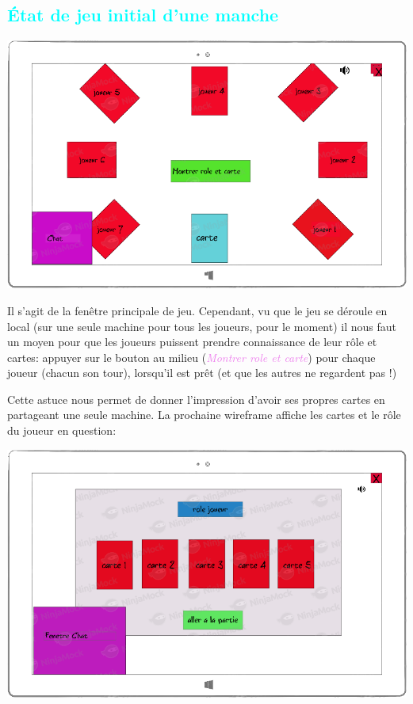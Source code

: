 \documentclass[a4paper]{article}
\let\oldsubsection\subsection
\renewcommand{\subsection}[1]{\textcolor{cyan}{\oldsubsection{#1}}}
\let\oldtextit\textit
\renewcommand{\textit}[1]{\textcolor{violet}{\oldtextit{#1}}}
\begin{document}
\subsection{État de jeu initial d'une manche}

\begin{center}
    \includegraphics[scale=2]{img/partie_avant_devoiler.png}
\end{center}

Il s'agit de la fenêtre principale de jeu. Cependant, vu que le jeu se déroule en local (sur une seule machine pour tous les joueurs, pour le moment) il nous faut un moyen pour que les joueurs puissent prendre connaissance de leur rôle et cartes: appuyer sur le bouton au milieu (\textit{Montrer role et carte}) pour chaque joueur (chacun son tour), lorsqu'il est prêt (et que les autres ne regardent pas !)

Cette astuce nous permet de donner l'impression d'avoir ses propres cartes en partageant une seule machine. La prochaine wireframe affiche les cartes et le rôle du joueur en question:

\begin{center}
    \includegraphics[scale=2]{img/decouvert_role_et_carte.png}
\end{center}
\end{document}
